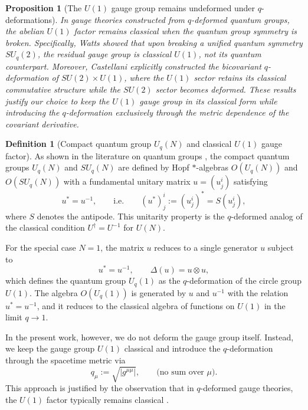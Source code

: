 \documentclass[12pt,a4paper]{article}
\theoremstyle{plain}
\newtheorem{proposition}[theorem]{Proposition}
\theoremstyle{definition}
\newtheorem{definition}[theorem]{Definition}
\begin{document}
\begin{proposition}[The $U(1)$ gauge group remains undeformed under $q$-deformations]
\label{prop:U1_undeformed}
In gauge theories constructed from $q$-deformed quantum groups, the abelian $U(1)$ factor remains classical when the quantum group symmetry is broken. Specifically, Watts \cite{Watts1997} showed that upon breaking a unified quantum symmetry $SU_q(2)$, the residual gauge group is classical $U(1)$, not its quantum counterpart. Moreover, Castellani \cite{Castellani1992} explicitly constructed the bicovariant $q$-deformation of $SU(2) \times U(1)$, where the $U(1)$ sector retains its classical commutative structure while the $SU(2)$ sector becomes deformed. These results justify our choice to keep the $U(1)$ gauge group in its classical form while introducing the $q$-deformation exclusively through the metric dependence of the covariant derivative.
\end{proposition}

\begin{definition}[Compact quantum group $U_q(N)$ and classical $U(1)$ gauge factor]
\label{def:UqN}
As shown in the literature on quantum groups \cite{KlimykSchmuedgen1997}, the compact quantum groups $U_q(N)$ and $SU_q(N)$ are defined by Hopf $*$-algebras $O(U_q(N))$ and $O(SU_q(N))$ with a fundamental unitary matrix $u = (u_j^i)$ satisfying
\begin{equation}
u^* = u^{-1}, \qquad \text{i.e.} \qquad (u^*)_j^i := (u_j^i)^* = S(u_j^i), \label{eq:unitarity_UqN}
\end{equation}
where $S$ denotes the antipode. This unitarity property is the $q$-deformed analog of the classical condition $U^\dagger = U^{-1}$ for $U(N)$.

For the special case $N = 1$, the matrix $u$ reduces to a single generator $u$ subject to
\begin{equation}
u^* = u^{-1}, \qquad \Delta(u) = u \otimes u, \label{eq:Uq1_relations}
\end{equation}
which defines the quantum group $U_q(1)$ as the $q$-deformation of the circle group $U(1)$. The algebra $O(U_q(1))$ is generated by $u$ and $u^{-1}$ with the relation $u^* = u^{-1}$, and it reduces to the classical algebra of functions on $U(1)$ in the limit $q \to 1$.

In the present work, however, we do not deform the gauge group itself. Instead, we keep the gauge group $U(1)$ classical and introduce the $q$-deformation through the spacetime metric via
\begin{equation}
q_\mu := \sqrt{|g^{\mu\mu}|}, \qquad \text{(no sum over } \mu\text{)}. \label{eq:q_metric_definition}
\end{equation}
This approach is justified by the observation that in $q$-deformed gauge theories, the $U(1)$ factor typically remains classical \cite{Castellani1992, Watts1997}.
\end{definition}
\end{document}
